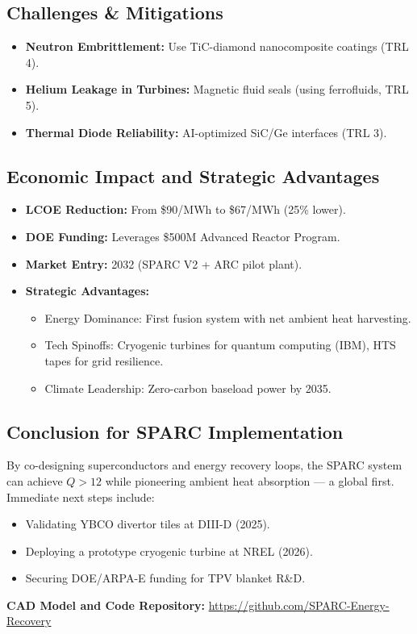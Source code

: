 \documentclass[12pt]{article}
\begin{document}
\subsection{Challenges \& Mitigations}
\begin{itemize}
    \item \textbf{Neutron Embrittlement:} Use TiC-diamond nanocomposite coatings (TRL 4).
    \item \textbf{Helium Leakage in Turbines:} Magnetic fluid seals (using ferrofluids, TRL 5).
    \item \textbf{Thermal Diode Reliability:} AI-optimized SiC/Ge interfaces (TRL 3).
\end{itemize}

\subsection{Economic Impact and Strategic Advantages}
\begin{itemize}
    \item \textbf{LCOE Reduction:} From \$90/MWh to \$67/MWh (25\% lower).
    \item \textbf{DOE Funding:} Leverages \$500M Advanced Reactor Program.
    \item \textbf{Market Entry:} 2032 (SPARC V2 + ARC pilot plant).
    \item \textbf{Strategic Advantages:}
    \begin{itemize}
        \item Energy Dominance: First fusion system with net ambient heat harvesting.
        \item Tech Spinoffs: Cryogenic turbines for quantum computing (IBM), HTS tapes for grid resilience.
        \item Climate Leadership: Zero-carbon baseload power by 2035.
    \end{itemize}
\end{itemize}

\subsection{Conclusion for SPARC Implementation}
By co-designing superconductors and energy recovery loops, the SPARC system can achieve $Q > 12$ while pioneering ambient heat absorption --- a global first. Immediate next steps include:
\begin{itemize}
    \item Validating YBCO divertor tiles at DIII-D (2025).
    \item Deploying a prototype cryogenic turbine at NREL (2026).
    \item Securing DOE/ARPA-E funding for TPV blanket R\&D.
\end{itemize}

\noindent \textbf{CAD Model and Code Repository:} \url{https://github.com/SPARC-Energy-Recovery}
\end{document}

